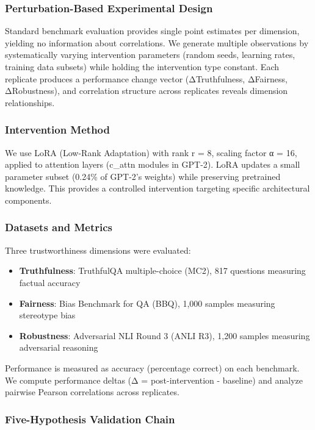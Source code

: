 
\subsubsection{Perturbation-Based Experimental Design}

Standard benchmark evaluation provides single point estimates per dimension, yielding no information about correlations. We generate multiple observations by systematically varying intervention parameters (random seeds, learning rates, training data subsets) while holding the intervention type constant. Each replicate produces a performance change vector (ΔTruthfulness, ΔFairness, ΔRobustness), and correlation structure across replicates reveals dimension relationships.

\subsubsection{Intervention Method}

We use LoRA (Low-Rank Adaptation) with rank r = 8, scaling factor α = 16, applied to attention layers (c_attn modules in GPT-2). LoRA updates a small parameter subset (0.24\% of GPT-2's weights) while preserving pretrained knowledge. This provides a controlled intervention targeting specific architectural components.

\subsubsection{Datasets and Metrics}

Three trustworthiness dimensions were evaluated:
\begin{itemize}
\item \textbf{Truthfulness}: TruthfulQA multiple-choice (MC2), 817 questions measuring factual accuracy
\item \textbf{Fairness}: Bias Benchmark for QA (BBQ), 1,000 samples measuring stereotype bias
\item \textbf{Robustness}: Adversarial NLI Round 3 (ANLI R3), 1,200 samples measuring adversarial reasoning
\end{itemize}

Performance is measured as accuracy (percentage correct) on each benchmark. We compute performance deltas (Δ = post-intervention - baseline) and analyze pairwise Pearson correlations across replicates.

\subsubsection{Five-Hypothesis Validation Chain}

